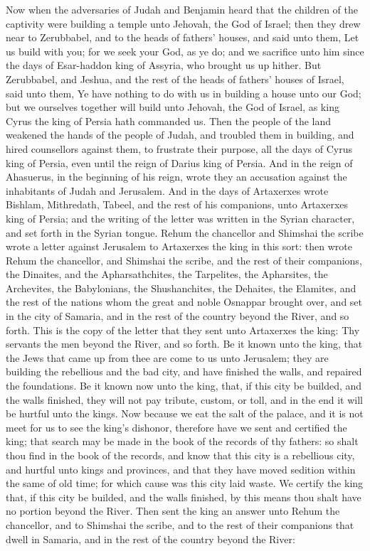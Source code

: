 Now when the adversaries of Judah and Benjamin heard that the children of the captivity were building a temple unto Jehovah, the God of Israel; then they drew near to Zerubbabel, and to the heads of fathers’ houses, and said unto them, Let us build with you; for we seek your God, as ye do; and we sacrifice unto him since the days of Esar-haddon king of Assyria, who brought us up hither. But Zerubbabel, and Jeshua, and the rest of the heads of fathers’ houses of Israel, said unto them, Ye have nothing to do with us in building a house unto our God; but we ourselves together will build unto Jehovah, the God of Israel, as king Cyrus the king of Persia hath commanded us. Then the people of the land weakened the hands of the people of Judah, and troubled them in building, and hired counsellors against them, to frustrate their purpose, all the days of Cyrus king of Persia, even until the reign of Darius king of Persia. And in the reign of Ahasuerus, in the beginning of his reign, wrote they an accusation against the inhabitants of Judah and Jerusalem.  And in the days of Artaxerxes wrote Bishlam, Mithredath, Tabeel, and the rest of his companions, unto Artaxerxes king of Persia; and the writing of the letter was written in the Syrian character, and set forth in the Syrian tongue. Rehum the chancellor and Shimshai the scribe wrote a letter against Jerusalem to Artaxerxes the king in this sort: then wrote Rehum the chancellor, and Shimshai the scribe, and the rest of their companions, the Dinaites, and the Apharsathchites, the Tarpelites, the Apharsites, the Archevites, the Babylonians, the Shushanchites, the Dehaites, the Elamites, and the rest of the nations whom the great and noble Osnappar brought over, and set in the city of Samaria, and in the rest of the country beyond the River, and so forth.  This is the copy of the letter that they sent unto Artaxerxes the king: Thy servants the men beyond the River, and so forth. Be it known unto the king, that the Jews that came up from thee are come to us unto Jerusalem; they are building the rebellious and the bad city, and have finished the walls, and repaired the foundations. Be it known now unto the king, that, if this city be builded, and the walls finished, they will not pay tribute, custom, or toll, and in the end it will be hurtful unto the kings. Now because we eat the salt of the palace, and it is not meet for us to see the king’s dishonor, therefore have we sent and certified the king; that search may be made in the book of the records of thy fathers: so shalt thou find in the book of the records, and know that this city is a rebellious city, and hurtful unto kings and provinces, and that they have moved sedition within the same of old time; for which cause was this city laid waste. We certify the king that, if this city be builded, and the walls finished, by this means thou shalt have no portion beyond the River.  Then sent the king an answer unto Rehum the chancellor, and to Shimshai the scribe, and to the rest of their companions that dwell in Samaria, and in the rest of the country beyond the River: 